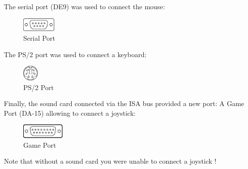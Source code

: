 \documentclass[book.tex]{subfiles}
\begin{document}
The serial port (DE9) was used to connect the mouse:
 \begin{figure}[H]
\centering
\includegraphics[width=0.15\textwidth]{imgs/ports/DE9_serial_port.eps}
%
\caption{Serial Port}
\label{fig:serialPort}
\end{figure}

The PS/2 port was used to connect a keyboard:
 \begin{figure}[H]
\centering
\includegraphics[width=0.07\textwidth]{imgs/ports/MiniDIN-6_PS2.eps}
%
\caption{PS/2 Port}
\label{fig:ps2Port}
\end{figure}


Finally, the sound card connected via the ISA bus provided a new port: A Game Port (DA-15) allowing to connect a joystick:
 \begin{figure}[H]
\centering
\includegraphics[width=0.19\textwidth]{imgs/ports/DA-15_GamePort.eps}
%
\caption{Game Port}
\label{fig:gamePort}
\end{figure}

Note that without a sound card you were unable to connect a joystick !
\end{document}
